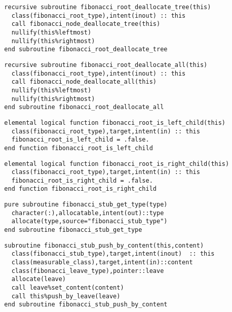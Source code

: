 \begin{Verbatim}
  recursive subroutine fibonacci_root_deallocate_tree(this)
    class(fibonacci_root_type),intent(inout) :: this
    call fibonacci_node_deallocate_tree(this)
    nullify(this%leftmost)
    nullify(this%rightmost)
  end subroutine fibonacci_root_deallocate_tree
\end{Verbatim}

\begin{Verbatim}
  recursive subroutine fibonacci_root_deallocate_all(this)
    class(fibonacci_root_type),intent(inout) :: this
    call fibonacci_node_deallocate_all(this)
    nullify(this%leftmost)
    nullify(this%rightmost)
  end subroutine fibonacci_root_deallocate_all
\end{Verbatim}

\begin{Verbatim}
  elemental logical function fibonacci_root_is_left_child(this)
    class(fibonacci_root_type),target,intent(in) :: this
    fibonacci_root_is_left_child = .false.
  end function fibonacci_root_is_left_child
\end{Verbatim}

\begin{Verbatim}
  elemental logical function fibonacci_root_is_right_child(this)
    class(fibonacci_root_type),target,intent(in) :: this
    fibonacci_root_is_right_child = .false.
  end function fibonacci_root_is_right_child
\end{Verbatim}

\begin{Verbatim}
  pure subroutine fibonacci_stub_get_type(type)
    character(:),allocatable,intent(out)::type
    allocate(type,source="fibonacci_stub_type")
  end subroutine fibonacci_stub_get_type
\end{Verbatim}

\begin{Verbatim}
  subroutine fibonacci_stub_push_by_content(this,content)
    class(fibonacci_stub_type),target,intent(inout)  :: this
    class(measurable_class),target,intent(in)::content
    class(fibonacci_leave_type),pointer::leave
    allocate(leave)
    call leave%set_content(content)
    call this%push_by_leave(leave)
  end subroutine fibonacci_stub_push_by_content
\end{Verbatim}
  
